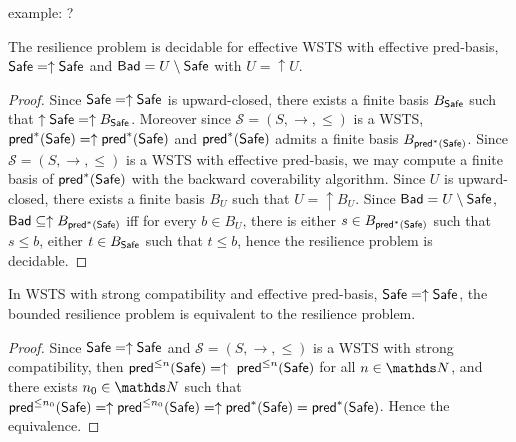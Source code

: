 \iffalse
\alain{à quoi ça sert ici ?: quelle signification ?Decidability of $U$ and $\Safe$ imply the decidability of $\Bad$.}
\mathieu{Pas convaincu que ça serve, je vais enlever}
\fi

example: ?


\begin{theorem}\label{up-up}
The resilience problem is decidable for effective WSTS with effective pred-basis, $\textsf{Safe}=\uparrow \textsf{Safe}$
and $\textsf{Bad}= U \setminus \textsf{Safe}$ with $U = \uparrow U$.
\end{theorem}


\begin{proof}
Since $\textsf{Safe}=\uparrow \textsf{Safe}$ is upward-closed, there exists a finite basis $B_{ \textsf{Safe}}$ such that $\uparrow \textsf{Safe} = \uparrow B_{\textsf{Safe}}$. 
Moreover since $\mathscr{S}=(S,\rightarrow,\leq)$ is a WSTS,  $\textsf{pred}^*(\textsf{Safe})=\uparrow \textsf{pred}^*(\textsf{Safe})$ and $\textsf{pred}^*(\textsf{Safe})$ admits a finite basis $B_{\textsf{pred}^*(\textsf{Safe})}$. Since $\mathscr{S}=(S,\rightarrow,\leq)$ is a WSTS  with effective pred-basis, we may compute a finite basis of $\textsf{pred}^*(\textsf{Safe})$ with the backward coverability algorithm. 
Since $U$  is upward-closed, there exists a finite basis $B_{U}$ such that $U = \uparrow B_{U}$. %
Since $\textsf{Bad} = U \setminus \textsf{Safe}$, $\textsf{Bad} \subseteq \uparrow B_{\textsf{pred}^*(\textsf{Safe})}$ iff for every $b \in B_{U}$, there is either $s \in B_{\textsf{pred}^*(\textsf{Safe})}$ such that $s \leq b$, either $t \in B_{\textsf{Safe}}$ such that $t\leq b$,
hence the resilience problem is decidable.
\end{proof}

\begin{proposition}
In WSTS with strong compatibility and effective pred-basis,  $\textsf{Safe}=\uparrow \textsf{Safe}$, the bounded resilience problem is equivalent to the resilience problem.
\end{proposition}

\begin{proof}
Since $\textsf{Safe}=\uparrow \textsf{Safe}$ and
$\mathscr{S}=(S,\rightarrow,\leq)$ is a WSTS with strong %
compatibility, then $\textsf{pred}^{\leq n}(\textsf{Safe})= \uparrow~\textsf{pred}^{\leq n}(\textsf{Safe})$ for all $n \in \N$,
and there exists $n_0 \in \N$ such that 
$\textsf{pred}^{\leq n_0}(\textsf{Safe}) = \uparrow \textsf{pred}^{\leq n_0}(\textsf{Safe}) = \uparrow \textsf{pred}^*(\textsf{Safe}) = \textsf{pred}^*(\textsf{Safe})$.
Hence the equivalence.
\end{proof}

